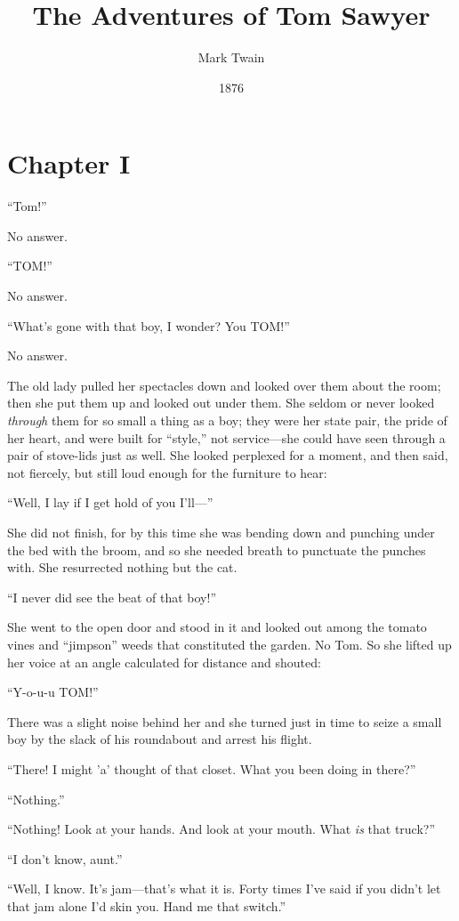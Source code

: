 \documentclass{book}
\title{The Adventures of Tom Sawyer}
\author{Mark Twain}
\date{1876}
\begin{document}
\maketitle

\chapter*{Chapter I}

“Tom!”

No answer.

“TOM!”

No answer.

“What’s gone with that boy, I wonder? You TOM!”

No answer.

The old lady pulled her spectacles down and looked over them about the room; then she put them up and looked out under them. She seldom or never looked \emph{through} them for so small a thing as a boy; they were her state pair, the pride of her heart, and were built for “style,” not service—she could have seen through a pair of stove-lids just as well. She looked perplexed for a moment, and then said, not fiercely, but still loud enough for the furniture to hear:

“Well, I lay if I get hold of you I’ll—”

She did not finish, for by this time she was bending down and punching under the bed with the broom, and so she needed breath to punctuate the punches with. She resurrected nothing but the cat.

“I never did see the beat of that boy!”

She went to the open door and stood in it and looked out among the tomato vines and “jimpson” weeds that constituted the garden. No Tom. So she lifted up her voice at an angle calculated for distance and shouted:

“Y-o-u-u TOM!”

There was a slight noise behind her and she turned just in time to seize a small boy by the slack of his roundabout and arrest his flight.

“There! I might ’a’ thought of that closet. What you been doing in there?”

“Nothing.”

“Nothing! Look at your hands. And look at your mouth. What \emph{is} that truck?”

“I don’t know, aunt.”

“Well, I know. It’s jam—that’s what it is. Forty times I’ve said if you didn’t let that jam alone I’d skin you. Hand me that switch.”
\end{document}
